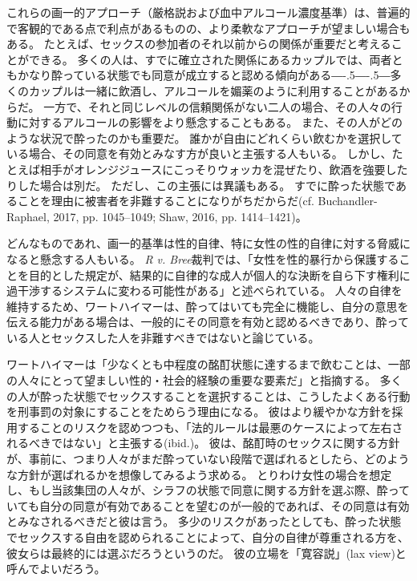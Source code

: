 \documentclass[paper=a4,book,openany]{jlreq}
\def\DDASH{―\kern-.5\zw―\kern-.5\zw―}
\begin{document}
これらの画一的アプローチ（厳格説および血中アルコール濃度基準）は、普遍的で客観的である点で利点があるものの、より柔軟なアプローチが望ましい場合もある。
たとえば、セックスの参加者のそれ以前からの関係が重要だと考えることができる。
多くの人は、すでに確立された関係にあるカップルでは、両者ともかなり酔っている状態でも同意が成立すると認める傾向がある{\DDASH}多くのカップルは一緒に飲酒し、アルコールを媚薬のように利用することがあるからだ。
一方で、それと同じレベルの信頼関係がない二人の場合、その人々の行動に対するアルコールの影響をより懸念することもある。
また、その人がどのような状況で酔ったのかも重要だ。
誰かが自由にどれくらい飲むかを選択している場合、その同意を有効とみなす方が良いと主張する人もいる。
しかし、たとえば相手がオレンジジュースにこっそりウォッカを混ぜたり、飲酒を強要したりした場合は別だ。
ただし、この主張には異議もある。
すでに酔った状態であることを理由に被害者を非難することになりがちだからだ(cf. Buchandler-Raphael, 2017, pp. 1045--1049; Shaw, 2016, pp. 1414--1421)\nocite{buchhandler-raphael17:_conun_volun_intox_sex}\nocite{shaw16:_title_ix_sexual_assaul_issue_effec_consen}。

どんなものであれ、画一的基準は性的自律、特に女性の性的自律に対する脅威になると懸念する人もいる。
\emph{R v. Bree}裁判では、「女性を性的暴行から保護することを目的とした規定が、結果的に自律的な成人が個人的な決断を自ら下す権利に過干渉するシステムに変わる可能性がある」と述べられている。
人々の自律を維持するため、ワートハイマーは、酔ってはいても完全に機能し、自分の意思を伝える能力がある場合は、一般的にその同意を有効と認めるべきであり、酔っている人とセックスした人を非難すべきではないと論じている。

ワートハイマーは「少なくとも中程度の酩酊状態に達するまで飲むことは、一部の人々にとって望ましい性的・社会的経験の重要な要素だ」と指摘する\citep[p. 251]{wertheimer03:_consen_sexual_relat}。
多くの人が酔った状態でセックスすることを選択することは、こうしたよくある行動を刑事罰の対象にすることをためらう理由になる。
彼はより緩やかな方針を採用することのリスクを認めつつも、「法的ルールは最悪のケースによって左右されるべきではない」と主張する(ibid.)。
彼は、酩酊時のセックスに関する方針が、事前に、つまり人々がまだ酔っていない段階で選ばれるとしたら、どのような方針が選ばれるかを想像してみるよう求める。
とりわけ女性の場合を想定し、もし当該集団の人々が、シラフの状態で同意に関する方針を選ぶ際、酔っていても自分の同意が有効であることを望むのが一般的であれば、その同意は有効とみなされるべきだと彼は言う。
多少のリスクがあったとしても、酔った状態でセックスする自由を認められることによって、自分の自律が尊重される方を、彼女らは最終的には選ぶだろうというのだ。
彼の立場を「寛容説」(lax view)と呼んでよいだろう。
\end{document}
